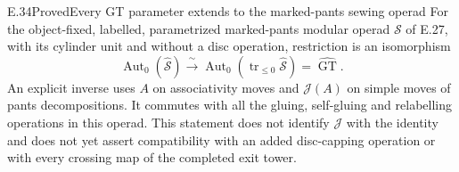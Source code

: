 \begin{result}{E.34}{Proved}{Every GT parameter extends to the marked-pants sewing operad}
For the object-fixed, labelled, parametrized marked-pants
modular operad $\mathcal S$ of E.27, with its cylinder
unit and without a disc operation, restriction is an
isomorphism
\[
 \operatorname{Aut}_0(\widehat{\mathcal S})
       \xrightarrow{\ \sim\ }
 \operatorname{Aut}_0(\operatorname{tr}_{\leq0}
                       \widehat{\mathcal S})
       =\widehat{\operatorname{GT}}.                    \tag{E.110}
\]
An explicit inverse uses $A$ on associativity moves
and $\mathcal J(A)$ on simple moves of pants
decompositions.  It commutes with all the gluing,
self-gluing and relabelling operations in this
operad.  This statement does not identify
$\mathcal J$ with the identity and does not yet
assert compatibility with an added disc-capping
operation or with every crossing map of the
completed exit tower.
\end{result}
